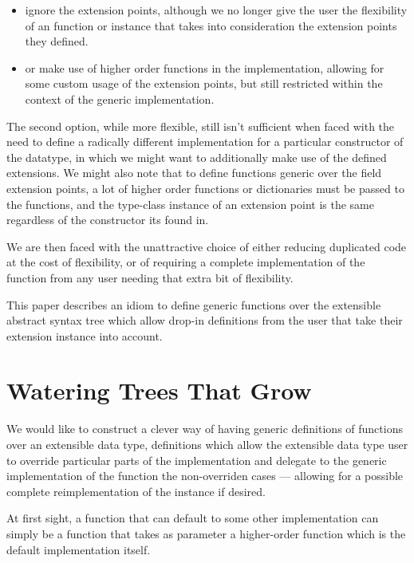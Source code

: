 \documentclass{article}
\begin{document}
\begin{itemize}
    \item ignore the extension points, although we no longer give the user the
        flexibility of an function or instance that takes into consideration the
        extension points they defined.

    \item or make use of higher order functions in the implementation, allowing for some
        custom usage of the extension points, but still restricted within the
        context of the generic implementation.
\end{itemize}

The second option, while more flexible, still isn't sufficient when faced with
the need to define a radically different implementation for a particular
constructor of the datatype, in which we might want to additionally make use of
the defined extensions. We might also note that to define functions generic over
the field extension points, a lot of higher order functions or dictionaries must
be passed to the functions, and the type-class instance of an extension point is
the same regardless of the constructor its found in.

We are then faced with the unattractive choice of either reducing duplicated
code at the cost of flexibility, or of requiring a complete implementation of the
function from any user needing that extra bit of flexibility.

This paper describes an idiom to define generic functions over the extensible
abstract syntax tree which allow drop-in definitions from the user that take
their extension instance into account.

\section{Watering Trees That Grow}

We would like to construct a clever way of having generic definitions of
functions over an extensible data type, definitions which allow the extensible
data type user to override particular parts of the implementation and delegate
to the generic implementation of the function the non-overriden cases ---
allowing for a possible complete reimplementation of the instance if desired.

At first sight, a function that can default to some other implementation can
simply be a function that takes as parameter a higher-order function which is
the default implementation itself.
\end{document}
